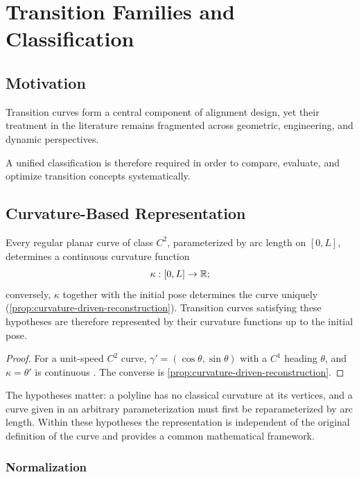 \chapter{Transition Families and Classification}

\section*{Motivation}

Transition curves form a central component of alignment design, yet
their treatment in the literature remains fragmented across geometric,
engineering, and dynamic perspectives.

A unified classification is therefore required in order to compare,
evaluate, and optimize transition concepts systematically.


\section{Curvature-Based Representation}

\begin{proposition}
\label{prop:transition-curvature-representation}
Every regular planar curve of class \(C^2\), parameterized by arc length
on \([0,L]\), determines a continuous curvature function
\[
\kappa : [0,L] \to \mathbb{R} ;
\]
conversely, \(\kappa\) together with the initial pose determines the curve
uniquely (\cref{prop:curvature-driven-reconstruction}). Transition curves
satisfying these hypotheses are therefore represented by their curvature
functions up to the initial pose.
\end{proposition}

\begin{proof}
For a unit-speed \(C^2\) curve, \(\gamma'=(\cos\theta,\sin\theta)\) with a
\(C^1\) heading \(\theta\), and \(\kappa=\theta'\) is continuous
\cite{DoCarmo1976Curves}. The converse is
\cref{prop:curvature-driven-reconstruction}.
\end{proof}

The hypotheses matter: a polyline has no classical curvature at its
vertices, and a curve given in an arbitrary parameterization must first be
reparameterized by arc length. Within these hypotheses the representation
is independent of the original definition of the curve and provides a
common mathematical framework.


\subsection{Normalization}

